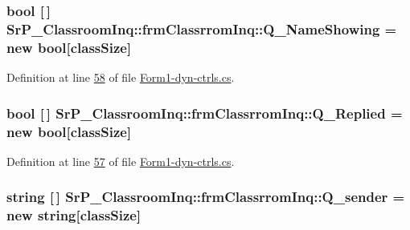 \hypertarget{class_sr_p___classroom_inq_1_1frm_classrrom_inq_a717931be8f79e53cf69e10515df3115e}{
\subsubsection[{\-Q\-\_\-\-Name\-Showing}]{\setlength{\rightskip}{0pt plus 5cm}bool \mbox{[}$\,$\mbox{]} {\bf \-Sr\-P\-\_\-\-Classroom\-Inq\-::frm\-Classrrom\-Inq\-::\-Q\-\_\-\-Name\-Showing} = new bool\mbox{[}{\bf class\-Size}\mbox{]}}}
\label{class_sr_p___classroom_inq_1_1frm_classrrom_inq_a717931be8f79e53cf69e10515df3115e}


\-Definition at line \hyperlink{_form1-dyn-ctrls_8cs_source_l00058}{58} of file \hyperlink{_form1-dyn-ctrls_8cs_source}{\-Form1-\/dyn-\/ctrls.\-cs}.

\hypertarget{class_sr_p___classroom_inq_1_1frm_classrrom_inq_af7c089d129d15a45c05bede3e9554f58}{
\subsubsection[{\-Q\-\_\-\-Replied}]{\setlength{\rightskip}{0pt plus 5cm}bool \mbox{[}$\,$\mbox{]} {\bf \-Sr\-P\-\_\-\-Classroom\-Inq\-::frm\-Classrrom\-Inq\-::\-Q\-\_\-\-Replied} = new bool\mbox{[}{\bf class\-Size}\mbox{]}}}
\label{class_sr_p___classroom_inq_1_1frm_classrrom_inq_af7c089d129d15a45c05bede3e9554f58}


\-Definition at line \hyperlink{_form1-dyn-ctrls_8cs_source_l00057}{57} of file \hyperlink{_form1-dyn-ctrls_8cs_source}{\-Form1-\/dyn-\/ctrls.\-cs}.

\hypertarget{class_sr_p___classroom_inq_1_1frm_classrrom_inq_afa4b6c4601d48db676d4013daef6624c}{
\subsubsection[{\-Q\-\_\-sender}]{\setlength{\rightskip}{0pt plus 5cm}string \mbox{[}$\,$\mbox{]} {\bf \-Sr\-P\-\_\-\-Classroom\-Inq\-::frm\-Classrrom\-Inq\-::\-Q\-\_\-sender} = new string\mbox{[}{\bf class\-Size}\mbox{]}}}
\label{class_sr_p___classroom_inq_1_1frm_classrrom_inq_afa4b6c4601d48db676d4013daef6624c}


